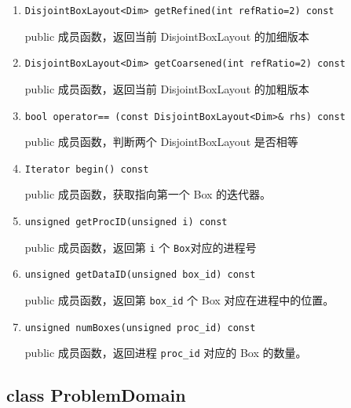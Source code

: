 \documentclass[cn, bibend=bibtex]{elegantpaper}
\theoremstyle{plain}
\begin{document}
\begin{itemize}
\begin{enumerate}
    \item \lstinline|DisjointBoxLayout<Dim> getRefined(int refRatio=2) const|

    public 成员函数，返回当前 DisjointBoxLayout 的加细版本

    \item \lstinline|DisjointBoxLayout<Dim> getCoarsened(int refRatio=2) const|

    public 成员函数，返回当前 DisjointBoxLayout 的加粗版本

    \item \lstinline|bool operator== (const DisjointBoxLayout<Dim>& rhs) const|

    public 成员函数，判断两个 DisjointBoxLayout 是否相等

    \item \lstinline|Iterator begin() const|

    public 成员函数，获取指向第一个 Box 的迭代器。
    \item \lstinline|unsigned getProcID(unsigned i) const|

    public 成员函数，返回第 \lstinline|i| 个 \lstinline|Box|对应的进程号
    \item \lstinline|unsigned getDataID(unsigned box_id) const|

    public 成员函数，返回第 \lstinline|box_id| 个 Box 对应在进程中的位置。
    \item \lstinline|unsigned numBoxes(unsigned proc_id) const|

    public 成员函数，返回进程 \lstinline|proc_id| 对应的 Box 的数量。
  \end{enumerate}
\end{itemize}


\subsection{class ProblemDomain}
\end{document}
